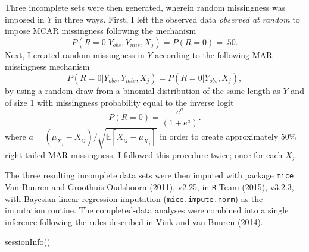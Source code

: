 \documentclass[
]{article}
\newenvironment{Shaded}{\begin{snugshade}}{\end{snugshade}}
\newcommand{\FunctionTok}[1]{\textcolor[rgb]{0.00,0.00,0.00}{#1}}
\newcommand{\NormalTok}[1]{#1}
\begin{document}
Three incomplete sets were then generated, wherein random missingness
was imposed in \(Y\) in three ways. First, I left the observed data
\emph{observed at random} to impose MCAR missingness following the
mechanism \[
P(R=0|Y_{obs},Y_{mis}, X_j)=P(R=0)=.50.
\] Next, I created random missingness in \(Y\) according to the
following MAR missingness mechanism \[
P(R=0|Y_{obs},Y_{mis}, X_j)=P(R=0|Y_{obs}, X_j),
\] by using a random draw from a binomial distribution of the same
length as \(Y\) and of size 1 with missingness probability equal to the
inverse logit \[
P(R=0)=\frac{e^{a}}{(1+e^{a})}.
\] where \(a=(\mu_{X_j}-X_{ij})/\sqrt{\mathbb{E}[X_{ij} - \mu_{X_j}]}\)
in order to create approximately 50\% right-tailed MAR missingness. I
followed this procedure twice; once for each \(X_j\).

The three resulting incomplete data sets were then imputed with package
\texttt{mice} Van Buuren and Groothuis-Oudshoorn (2011), v2.25, in
\texttt{R} Team (2015), v3.2.3, with Bayesian linear regression
imputation (\texttt{mice.impute.norm}) as the imputation routine. The
completed-data analyses were combined into a single inference following
the rules described in Vink and van Buuren (2014).

\begin{Shaded}
\begin{Highlighting}[]
\FunctionTok{sessionInfo}\NormalTok{()}
\end{Highlighting}
\end{Shaded}
\end{document}
